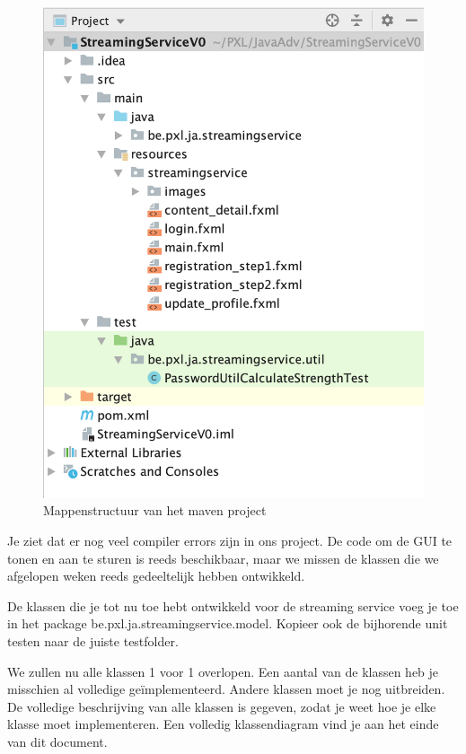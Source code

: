 \documentclass{tstextbook}
\begin{document}
\begin{figure}
  \includegraphics{images/h1/maven_project_structuur.png}
  \caption{Mappenstructuur van het maven project}
  \label{fig:maven_project_structure}
\end{figure}


Je ziet dat er nog veel compiler errors zijn in ons project. De code om de GUI te tonen en aan te sturen is reeds beschikbaar, maar we missen de klassen die we afgelopen weken reeds gedeeltelijk hebben ontwikkeld. 
\begin{theorem}
De klassen die je tot nu toe hebt ontwikkeld voor de streaming service voeg je toe in het package be.pxl.ja.streamingservice.model. Kopieer ook de bijhorende unit testen naar de juiste testfolder.  
\end{theorem}

We zullen nu alle klassen 1 voor 1 overlopen. Een aantal van de klassen heb je misschien al volledige ge\"implementeerd. Andere klassen moet je nog uitbreiden. De volledige beschrijving van alle klassen is gegeven, zodat je weet hoe je elke klasse moet implementeren. 
Een volledig klassendiagram vind je aan het einde van dit document.
\end{document}
